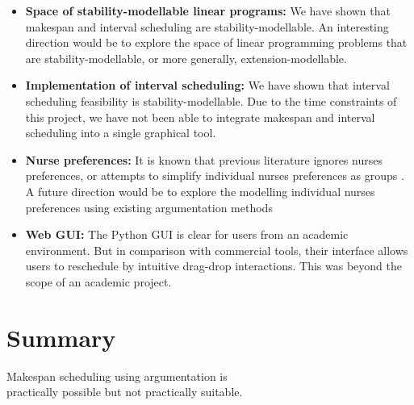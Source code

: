 \begin{itemize}
	\item\textbf{Space of stability-modellable linear programs:} We have shown that makespan and interval scheduling are stability-modellable. An interesting direction would be to explore the space of linear programming problems that are stability-modellable, or more generally, extension-modellable.
	\item\textbf{Implementation of interval scheduling:} We have shown that interval scheduling feasibility is stability-modellable. Due to the time constraints of this project, we have not been able to integrate makespan and interval scheduling into a single graphical tool.
	\item\textbf{Nurse preferences:} It is known that previous literature ignores nurses preferences, or attempts to simplify individual nurses preferences as groups \cite{preferences}. A future direction would be to explore the modelling individual nurses preferences using existing argumentation methods \cite{acceptability, aba}
	\item\textbf{Web GUI:} The Python GUI is clear for users from an academic environment. But in comparison with commercial tools, their interface allows users to reschedule by intuitive drag-drop interactions. This was beyond the scope of an academic project.
\end{itemize}

\section{Summary}

\begin{framed}
	\centering
	Makespan scheduling using argumentation is\\practically
	possible but not practically suitable.
\end{framed}